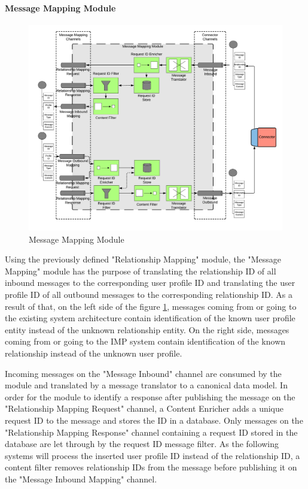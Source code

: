 \paragraph{Message Mapping Module}

\begin{figure}[H]
    \centering
    \includegraphics[scale=0.6]{Diagrams/Integration Architecture 1/Technological Integration/10. Message Mapping Module.pdf}
    \caption{Message Mapping Module}
    \label{integration1:message_mapping_module}
\end{figure}

Using the previously defined "Relationship Mapping" module, the "Message Mapping" module has the purpose of translating the relationship ID of all inbound messages to the corresponding user profile ID and translating the user profile ID of all outbound messages to the corresponding relationship ID. As a result of that, on the left side of the figure \ref{integration1:message_mapping_module}, messages coming from or going to the existing system architecture contain identification of the known user profile entity instead of the unknown relationship entity. On the right side, messages coming from or going to the IMP system contain identification of the known relationship instead of the unknown user profile.

Incoming messages on the "Message Inbound" channel are consumed by the module and translated by a message translator to a canonical data model. In order for the module to identify a response after publishing the message on the "Relationship Mapping Request" channel, a Content Enricher adds a unique request ID to the message and stores the ID in a database. Only messages on the "Relationship Mapping Response" channel containing a request ID stored in the database are let through by the request ID message filter. As the following systems will process the inserted user profile ID instead of the relationship ID, a content filter removes relationship IDs from the message before publishing it on the "Message Inbound Mapping" channel.

